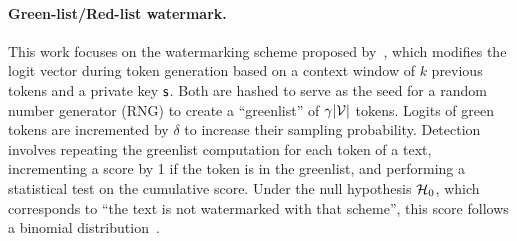 
\paragraph{\textbf{Green-list/Red-list watermark.}} This work focuses on the watermarking scheme proposed by~\citet{kirchenbauer2023reliability}, which modifies the logit vector during token generation based on a context window of $k$ previous tokens and a private key $\mathsf{s}$. 
Both are hashed to serve as the seed for a random number generator (RNG) to create a ``greenlist'' of $\gamma |\mathcal{V}|$ tokens. Logits of green tokens are incremented by $\delta$ to increase their sampling probability.
Detection involves repeating the greenlist computation for each token of a text, incrementing a score by 1 if the token is in the greenlist, and performing a statistical test on the cumulative score.
Under the null hypothesis $\mathcal{H}_0$, which corresponds to ``the text is not watermarked with that scheme'', this score follows a binomial distribution~\citep{fernandez2023three}.


